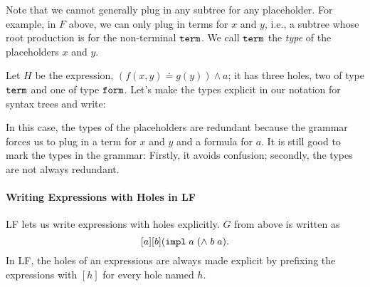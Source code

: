 \begin{center}
\end{center}

Note that we cannot generally plug in any subtree for any placeholder. For example, in $F$ above, we can only plug in terms for $x$ and $y$, i.e., a subtree whose root production is for the non-terminal $\mathtt{term}$. We call $\mathtt{term}$ the \emph{type} of the placeholders $x$ and $y$.

Let $H$ be the expression, $(f(x,y)\doteq g(y))\wedge a$; it has three holes, two of type $\mathtt{term}$ and one of type $\mathtt{form}$. Let's make the types explicit in our notation for syntax trees and write:

\begin{center}
\end{center}

In this case, the types of the placeholders are redundant because the grammar forces us to plug in a term for $x$ and $y$ and a formula for $a$. It is still good to mark the types in the grammar: Firstly, it avoids confusion; secondly, the types are not always redundant.


\paragraph{Writing Expressions with Holes in LF}
LF lets us write expressions with holes explicitly. $G$ from above is written as
\[[a][b] (\mathtt{impl}\;a\;(\mathtt{\wedge}\;b\;a).\]
In LF, the holes of an expressions are always made explicit by prefixing the expressions with $[h]$ for every hole named $h$.

